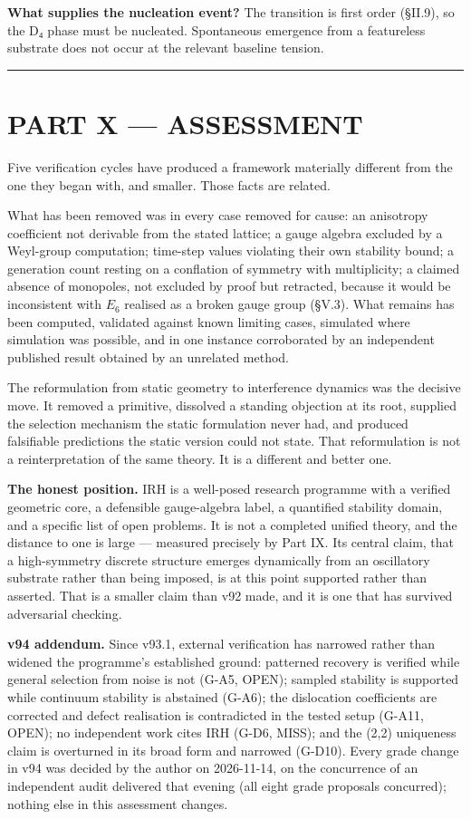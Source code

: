 \documentclass[a4paper,11pt]{article}
\begin{document}
\textbf{What supplies the nucleation event?} The transition is first order (§II.9), so the D₄ phase must be nucleated. Spontaneous emergence from a featureless substrate does not occur at the relevant baseline tension.

\medskip\hrule\medskip

\section*{PART X — ASSESSMENT}

Five verification cycles have produced a framework materially different from the one they began with, and smaller. Those facts are related.

What has been removed was in every case removed for cause: an anisotropy coefficient not derivable from the stated lattice; a gauge algebra excluded by a Weyl-group computation; time-step values violating their own stability bound; a generation count resting on a conflation of symmetry with multiplicity; a claimed absence of monopoles, not excluded by proof but retracted, because it would be inconsistent with $E_6$ realised as a broken gauge group (§V.3). What remains has been computed, validated against known limiting cases, simulated where simulation was possible, and in one instance corroborated by an independent published result obtained by an unrelated method.

The reformulation from static geometry to interference dynamics was the decisive move. It removed a primitive, dissolved a standing objection at its root, supplied the selection mechanism the static formulation never had, and produced falsifiable predictions the static version could not state. That reformulation is not a reinterpretation of the same theory. It is a different and better one.

\textbf{The honest position.} IRH is a well-posed research programme with a verified geometric core, a defensible gauge-algebra label, a quantified stability domain, and a specific list of open problems. It is not a completed unified theory, and the distance to one is large — measured precisely by Part IX. Its central claim, that a high-symmetry discrete structure emerges dynamically from an oscillatory substrate rather than being imposed, is at this point supported rather than asserted. That is a smaller claim than v92 made, and it is one that has survived adversarial checking.

\textbf{v94 addendum.} Since v93.1, external verification has narrowed rather than widened the programme's established ground: patterned recovery is verified while general selection from noise is not (G-A5, OPEN); sampled stability is supported while continuum stability is abstained (G-A6); the dislocation coefficients are corrected and defect realisation is contradicted in the tested setup (G-A11, OPEN); no independent work cites IRH (G-D6, MISS); and the (2,2) uniqueness claim is overturned in its broad form and narrowed (G-D10). Every grade change in v94 was decided by the author on 2026-11-14, on the concurrence of an independent audit delivered that evening (all eight grade proposals concurred); nothing else in this assessment changes.
\end{document}
